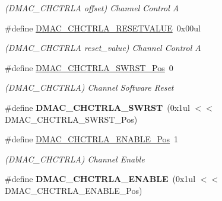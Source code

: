 \begin{DoxyCompactItemize}
\begin{DoxyCompactList}\small\item\em (D\+M\+A\+C\+\_\+\+C\+H\+C\+T\+R\+L\+A offset) Channel Control A \end{DoxyCompactList}\item 
\hypertarget{group___s_a_m_l21___d_m_a_c_ga28d42b2361a2edaff8d5ddb89e5f8be5}{}\#define \hyperlink{group___s_a_m_l21___d_m_a_c_ga28d42b2361a2edaff8d5ddb89e5f8be5}{D\+M\+A\+C\+\_\+\+C\+H\+C\+T\+R\+L\+A\+\_\+\+R\+E\+S\+E\+T\+V\+A\+L\+U\+E}~0x00ul\label{group___s_a_m_l21___d_m_a_c_ga28d42b2361a2edaff8d5ddb89e5f8be5}

\begin{DoxyCompactList}\small\item\em (D\+M\+A\+C\+\_\+\+C\+H\+C\+T\+R\+L\+A reset\+\_\+value) Channel Control A \end{DoxyCompactList}\item 
\hypertarget{group___s_a_m_l21___d_m_a_c_gad3c2eb1111a28a2450f5264d0e66d415}{}\#define \hyperlink{group___s_a_m_l21___d_m_a_c_gad3c2eb1111a28a2450f5264d0e66d415}{D\+M\+A\+C\+\_\+\+C\+H\+C\+T\+R\+L\+A\+\_\+\+S\+W\+R\+S\+T\+\_\+\+Pos}~0\label{group___s_a_m_l21___d_m_a_c_gad3c2eb1111a28a2450f5264d0e66d415}

\begin{DoxyCompactList}\small\item\em (D\+M\+A\+C\+\_\+\+C\+H\+C\+T\+R\+L\+A) Channel Software Reset \end{DoxyCompactList}\item 
\hypertarget{group___s_a_m_l21___d_m_a_c_ga6dc3b6a2f65f0cab7ee1214749ca2c70}{}\#define {\bfseries D\+M\+A\+C\+\_\+\+C\+H\+C\+T\+R\+L\+A\+\_\+\+S\+W\+R\+S\+T}~(0x1ul $<$$<$ D\+M\+A\+C\+\_\+\+C\+H\+C\+T\+R\+L\+A\+\_\+\+S\+W\+R\+S\+T\+\_\+\+Pos)\label{group___s_a_m_l21___d_m_a_c_ga6dc3b6a2f65f0cab7ee1214749ca2c70}

\item 
\hypertarget{group___s_a_m_l21___d_m_a_c_gabb1481a4309fd1a6c2456c48db79f393}{}\#define \hyperlink{group___s_a_m_l21___d_m_a_c_gabb1481a4309fd1a6c2456c48db79f393}{D\+M\+A\+C\+\_\+\+C\+H\+C\+T\+R\+L\+A\+\_\+\+E\+N\+A\+B\+L\+E\+\_\+\+Pos}~1\label{group___s_a_m_l21___d_m_a_c_gabb1481a4309fd1a6c2456c48db79f393}

\begin{DoxyCompactList}\small\item\em (D\+M\+A\+C\+\_\+\+C\+H\+C\+T\+R\+L\+A) Channel Enable \end{DoxyCompactList}\item 
\hypertarget{group___s_a_m_l21___d_m_a_c_gae2f13549f4059e9990a0551e6425543b}{}\#define {\bfseries D\+M\+A\+C\+\_\+\+C\+H\+C\+T\+R\+L\+A\+\_\+\+E\+N\+A\+B\+L\+E}~(0x1ul $<$$<$ D\+M\+A\+C\+\_\+\+C\+H\+C\+T\+R\+L\+A\+\_\+\+E\+N\+A\+B\+L\+E\+\_\+\+Pos)\label{group___s_a_m_l21___d_m_a_c_gae2f13549f4059e9990a0551e6425543b}


\end{DoxyCompactItemize}
